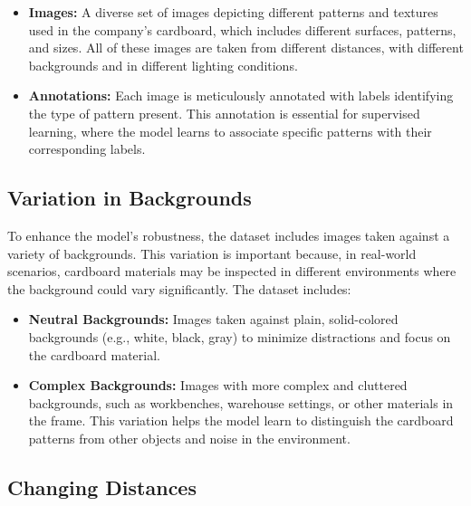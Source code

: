 \begin{itemize}
	\item \textbf{Images:} A diverse set of images depicting different patterns and textures used in the company's cardboard, which includes different surfaces, patterns, and sizes. All of these images are taken from different distances, with different backgrounds and in different lighting conditions.
	\item \textbf{Annotations:} Each image is meticulously annotated with labels identifying the type of pattern present. This annotation is essential for supervised learning, where the model learns to associate specific patterns with their corresponding labels.
\end{itemize}



\subsection{Variation in Backgrounds}

To enhance the model's robustness, the dataset includes images taken against a variety of backgrounds. This variation is important because, in real-world scenarios, cardboard materials may be inspected in different environments where the background could vary significantly. The dataset includes:


\begin{itemize}
	\item \textbf{Neutral Backgrounds:} Images taken against plain, solid-colored backgrounds (e.g., white, black, gray) to minimize distractions and focus on the cardboard material.
	\item \textbf{Complex Backgrounds: } Images with more complex and cluttered backgrounds, such as workbenches, warehouse settings, or other materials in the frame. This variation helps the model learn to distinguish the cardboard patterns from other objects and noise in the environment.
\end{itemize}



\subsection{Changing Distances}

